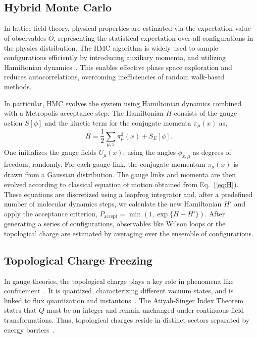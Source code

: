 \documentclass[a4paper,11pt]{article}
\begin{document}
\subsection{Hybrid Monte Carlo}
In lattice field theory, physical properties are estimated via the expectation value of observables $\hat{O}$, representing the statistical expectation over all configurations in the physics distribution. The HMC algorithm is widely used to sample configurations efficiently by introducing auxiliary momenta, and utilizing Hamiltonian dynamics~\cite{Duane:1987de,Hasenbusch:2001ne,Hasenbusch:2002ai,Gattringer:2010zz,Neal:2011mrf}. This enables effective phase space exploration and reduces autocorrelations, overcoming inefficiencies of random walk-based methods.

In particular, HMC evolves the system using Hamiltonian dynamics combined with a Metropolis acceptance step. The Hamiltonian $H$ consists of the gauge action $S[\phi]$ and the kinetic term for the conjugate momenta $\pi_{\mu}(x)$ as,
\begin{equation}
\label{eq:H}
H =  \frac{1}{2} \sum_{\mu, x} \pi^2_{\mu}(x) + S_E[\phi].
\end{equation}
One initializes the gauge fields $U_{\mu}(x)$, using the angles $\phi_{x,\mu}$ as degrees of freedom, randomly. For each gauge link, the conjugate momentum $\pi_{\mu}(x)$ is drawn from a Gaussian distribution. The gauge links and momenta are then evolved according to classical equation of motion obtained from Eq.~(\ref{eq:H}). These equations are discretized using a leapfrog integrator and, after a predefined number of molecular dynamics steps, we calculate the new Hamiltonian $H'$ and apply the acceptance criterion, $P_{\text{accept}} = \min(1, \exp{\{H - H'\}}).$ After generating a series of configurations, observables like  Wilson loops or the topological charge are estimated by averaging over the ensemble of configurations.



\subsection{Topological Charge Freezing}

In gauge theories, the topological charge plays a key role in phenomena like confinement~\cite{Greensite:2011zz}. It is quantized, characterizing different vacuum states, and is linked to flux quantization and instantons~\cite{Greensite:2011zz}. The Atiyah-Singer Index Theorem~\cite{Atiyah:1968mp} states that $Q$ must be an integer and remain unchanged under continuous field transformations. Thus, topological charges reside in distinct sectors separated by energy barriers~\cite{Eichhorn:2023uge,Durr:2024dal}.
\end{document}
